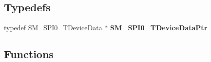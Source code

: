 \subsection*{Typedefs}
\begin{DoxyCompactItemize}
\item 
\hypertarget{group___s_m___s_p_i0__module_ga7b3a2a927126200eaa5ba544374c2559}{typedef \hyperlink{struct_s_m___s_p_i0___t_device_data}{S\-M\-\_\-\-S\-P\-I0\-\_\-\-T\-Device\-Data} $\ast$ {\bfseries S\-M\-\_\-\-S\-P\-I0\-\_\-\-T\-Device\-Data\-Ptr}}\label{group___s_m___s_p_i0__module_ga7b3a2a927126200eaa5ba544374c2559}

\end{DoxyCompactItemize}
\subsection*{Functions}
